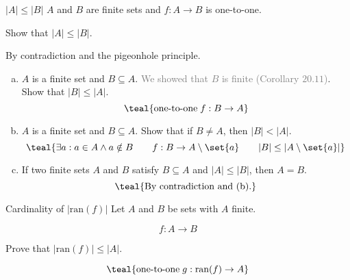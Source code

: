 \begin{frame}{}
  \begin{exampleblock}{$|A| \le |B|$}
    $A$ and $B$ are finite sets and $f: A \to B$ is one-to-one.

    Show that $|A| \le |B|$.
  \end{exampleblock}

  \pause

  \pause
  \vspace{0.30cm}
  \centerline{By contradiction and the pigeonhole principle.}
\end{frame}

\begin{frame}{}
  \begin{exampleblock}{}
    \begin{enumerate}[(a)]
      \item $A$ is a finite set and $B \subseteq A$. \textcolor{gray}{We showed that $B$ is finite (Corollary $20.11$)}. Show that $|B| \le |A|$.
	\pause
	\[
	  \teal{\text{one-to-one} \;f: B \to A}
	\]
      \item \pause $A$ is a finite set and $B \subseteq A$. Show that if $B \neq A$, then $|B| < |A|$.
	\pause
	\[
	  \teal{\exists a: a \in A \land a \notin B \qquad f: B \to A \setminus \set{a} \qquad |B| \le |A \setminus \set{a}|}
	\]
      \item \pause If two finite sets $A$ and $B$ satisfy $B \subseteq A$ and $|A| \le |B|$, then $A = B$.
	\pause
	\[
	  \teal{\text{By contradiction and (b).}}
	\]
    \end{enumerate}
  \end{exampleblock}
\end{frame}

\begin{frame}{}
  \begin{exampleblock}{Cardinality of $|\text{ran}(f)|$}
    Let $A$ and $B$ be sets with $A$ finite.

    \[
      f: A \to B
    \]

    Prove that $|\text{ran}(f)| \le |A|$.
  \end{exampleblock}

  \pause
  \vspace{0.50cm}
  \[
    \teal{\text{one-to-one} \;g: \text{ran}(f) \to A}
  \]
  \pause
  \centerline{}
\end{frame}

